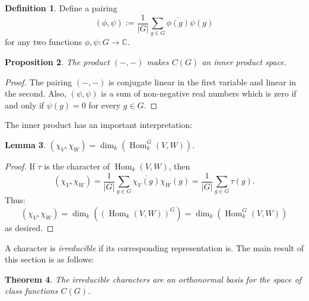 \documentclass[12pt]{article}
\theoremstyle{plain}
\newtheorem{theorem}{Theorem}[section]
\newtheorem{lemma}[theorem]{Lemma}
\newtheorem{proposition}[theorem]{Proposition}
\theoremstyle{definition}
\newtheorem{definition}[theorem]{Definition}
\theoremstyle{remark}
\numberwithin{equation}{section}
\begin{document}
\begin{definition} \label{def:innerProduct}
Define a pairing
\[
( \phi , \psi ) := \frac{1}{|G|}
\sum_{g \in G} \overline{\phi(g)} \psi(g)
\]
for any two functions $\phi, \psi : G \to \mathbb{C}$.
\end{definition}

\begin{proposition}
The product $(-,-)$ makes $C(G)$ an inner product space.
\end{proposition}

\begin{proof}
The pairing $(-,-)$ is conjugate linear in the first variable and linear in
the second.  Also, $(\psi,\psi)$ is a sum of non-negative real numbers
which is zero if and only if $\psi(g)=0$ for every $g \in G$.
\end{proof}


The inner product has an important interpretation:

\begin{lemma}
$\displaystyle
(\chi_V, \chi_W) = \dim_k\left( \operatorname{Hom}^G_k\left(V,
W\right)\right)$.
\end{lemma}

\begin{proof}
If $\tau$ is the character of $\operatorname{Hom}_k(V,W)$, then
\[ ( \chi_V , \chi_W ) = \frac{1}{|G|}
\sum_{g \in G} \overline{\chi_V(g)} \chi_W(g)
= \frac{1}{|G|} \sum_{g \in G} \tau(g) .
\]
Thus:
\[ ( \chi_V , \chi_W ) =
\dim_k\left(\left( \operatorname{Hom}_k\left(V,W\right) \right)^G\right) =
\dim_k( \operatorname{Hom}^G_k(V,W) ) \]
as desired.
\end{proof}

A character is \emph{irreducible} if its corresponding representation
is.
The main result of this section is as follows:

\begin{theorem}
The irreducible characters are an orthonormal basis for the space of
class functions $C(G)$.
\end{theorem}
\end{document}
